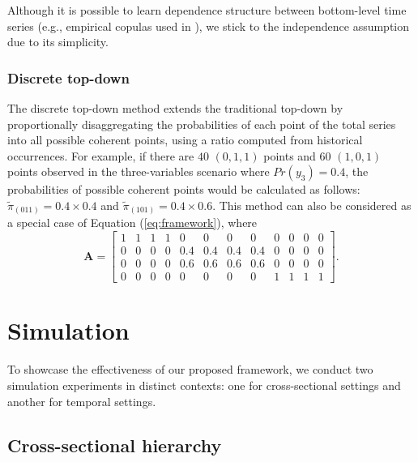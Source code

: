 \documentclass[a4paper,review,12pt,authoryear]{elsarticle}
\begin{document}
    Although it is possible to learn dependence structure between bottom-level time series (e.g., empirical copulas used in \citealp{bentaiebHierarchicalProbabilisticForecasting2020}), we stick to the independence assumption due to its simplicity.

    \subsubsection*{\textbf{Discrete top-down}}

    The discrete top-down method extends the traditional top-down by proportionally disaggregating the probabilities of each point of the total series into all possible coherent points, using a ratio computed from historical occurrences.
    For example, if there are $40$ $(0, 1, 1)$ points and $60$ $(1, 0, 1) $ points observed in the three-variables scenario where $Pr(y_3) = 0.4$, the probabilities of possible coherent points would be calculated as follows: $\tilde \pi_{(011)} = 0.4\times 0.4$ and $\tilde \pi_{(101)} = 0.4\times 0.6$.
    This method can also be considered as a special case of Equation (\ref{eq:framework}), where
    \[
    \mathbf{A} = \left[\begin{matrix}
      1 & 1 & 1 & 1 & 0 & 0 & 0 & 0 & 0 & 0 & 0 & 0 \\
      0 & 0 & 0 & 0 & 0.4 & 0.4 & 0.4 & 0.4 & 0 & 0 & 0 & 0 \\      
      0 & 0 & 0 & 0 & 0.6 & 0.6 & 0.6 & 0.6 & 0 & 0 & 0 & 0 \\
      0 & 0 & 0 & 0 & 0 & 0 & 0 & 0 & 1 & 1 & 1 & 1  
    \end{matrix}\right].
    \]

\section{Simulation}
\label{sec:simulation}

To showcase the effectiveness of our proposed framework, we conduct two simulation experiments in distinct contexts: one for cross-sectional settings and another for temporal settings. 
     
  \subsection{Cross-sectional hierarchy}
  \label{sec:cross-sectional_simu}
\end{document}
